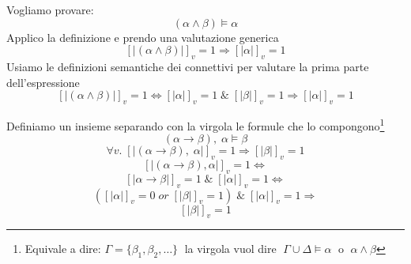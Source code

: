 \documentclass{article}
\theoremstyle{break}
\theoremstyle{break}
\theoremstyle{break}
\theoremstyle{break}
\begin{document}
\begin{exercise}[easy]
	Vogliamo provare:
	\[
		(\alpha \wedge \beta) \models \alpha
	\]
	Applico la definizione e prendo una valutazione generica
	\[
		[|(\alpha \wedge \beta)|]_v =1 \Rightarrow [|\alpha|]_v=1
	\]
	Usiamo le definizioni semantiche dei connettivi per valutare la prima parte dell'espressione
	\[
		[|(\alpha \wedge \beta)|]_v=1 \Leftrightarrow [|\alpha|]_v=1\; \&\; [|\beta|]_v=1
		\Rightarrow [|\alpha|]_v=1
	\]
\end{exercise}

\begin{exercise}
	Definiamo un insieme separando con la virgola le formule che lo compongono\footnote{
		Equivale a dire: \( \Gamma=\{ \beta_1, \beta_2, \ldots \}\; \) la virgola vuol dire
		\(\; \Gamma \cup \Delta \models \alpha\; \) o \(\; \alpha \wedge \beta \)
	}
	\[
		(\alpha \to \beta),\; \alpha \models \beta
	\]
	\[
		\forall v.\; [|(\alpha \to \beta),\; \alpha|]_v=1 \Rightarrow [|\beta|]_v=1
	\]
	\[
		[|(\alpha \to \beta), \alpha|]_v=1 \Leftrightarrow\]
	\[[|\alpha \to \beta|]_v=1\; \&\; [|\alpha|]_v=1 \Leftrightarrow
	\]
	\[
		([|\alpha|]_v=0\; or\; [|\beta|]_v=1)\; \&\; [|\alpha|]_v=1 \Rightarrow
	\]
	\[
		[|\beta|]_v=1
	\]
\end{exercise}
\end{document}

